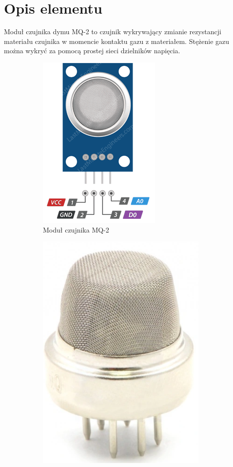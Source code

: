 \documentclass[11pt, a4paper]{article}
\author{Adam Rewekant}
\institute{Instytut Robotyki i Inteligencji Maszynowej}
\begin{document}

\newpage
\section*{Opis elementu} 
Moduł czujnika dymu MQ-2 to czujnik wykrywający zmianie rezystancji materiału czujnika w momencie kontaktu gazu z materiałem. Stężenie gazu można wykryć za pomocą prostej sieci dzielników napięcia. 



\vspace{0.5cm}
\begin{figure}[h]
\centering
\begin{subfigure}{.5\textwidth}
  \centering
  \includegraphics[width=.6\linewidth]{fig/element/pinfot.png}
  \caption{Moduł czujnika MQ-2 \cite{fot1}}
  \label{fig:sub1}
\end{subfigure}%
\begin{subfigure}{.5\textwidth}
  \centering
  \includegraphics[width=.6\linewidth]{fig/element/elemfot.png}

\end{subfigure}
\end{figure}
\end{document}
